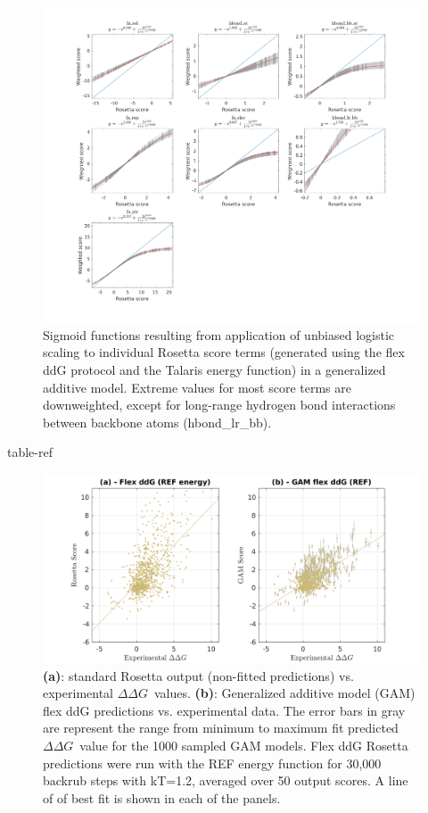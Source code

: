 \documentclass[journal=jpcbfk,manuscript=suppinfo]{achemso}
\newcommand\ddg{$\Delta\Delta G$}
\begin{document}
\begin{figure}
  \centering
  \includegraphics[width=\textwidth,keepaspectratio]{figures/zemu-sigmoid2-tal-feats.png}
  \caption[Sigmoid fit Rosetta score function terms]{
    Sigmoid functions resulting from application of unbiased logistic scaling to individual Rosetta score terms (generated using the flex ddG protocol and the Talaris energy function\cite{song_structure-guided_2011,shapovalov_smoothed_2011,omeara_combined_2015}) in a generalized additive model. Extreme values for most score terms are downweighted, except for long-range hydrogen bond interactions between backbone atoms (hbond\_lr\_bb).
  } \label{fig:t14-fits-feats}
\end{figure}

{table-ref}

\begin{figure}
  \includegraphics[width=\textwidth,keepaspectratio]{figures/zemu-sigmoid2-corrs-supp.png}
  \caption[]{
    \textbf{(a)}: standard Rosetta output (non-fitted predictions) vs. experimental \ddg\ values.
    \textbf{(b)}: Generalized additive model (GAM) flex ddG predictions vs. experimental data.
    The error bars in gray are represent the range from minimum to maximum fit predicted \ddg\ value for the 1000 sampled GAM models.
    Flex ddG Rosetta predictions were run with the REF energy function\cite{alford_rosetta_2017} for 30,000 backrub steps with kT=1.2, averaged over 50 output scores.
    A line of of best fit is shown in each of the panels.
  } \label{fig:t14-fit-scatter-supp}
\end{figure}
\end{document}
